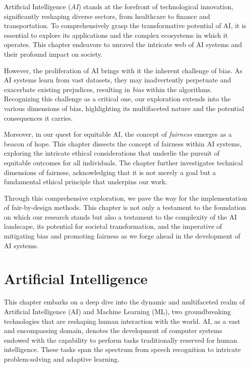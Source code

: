 \documentclass[12pt,a4paper,openright,twoside]{book}
\begin{document}
Artificial Intelligence (\emph{AI}) stands at the forefront of technological innovation, significantly reshaping diverse sectors, from healthcare to finance and transportation. To comprehensively grasp the transformative potential of AI, it is essential to explore its applications and the complex ecosystems in which it operates. This chapter endeavors to unravel the intricate web of AI systems and their profound impact on society.

However, the proliferation of AI brings with it the inherent challenge of bias. As AI systems learn from vast datasets, they may inadvertently perpetuate and exacerbate existing prejudices, resulting in \emph{bias} within the algorithms. Recognizing this challenge as a critical one, our exploration extends into the various dimensions of bias, highlighting its multifaceted nature and the potential consequences it carries. 

Moreover, in our quest for equitable AI, the concept of \emph{fairness} emerges as a beacon of hope. This chapter dissects the concept of fairness within AI systems, exploring the intricate ethical considerations that underlie the pursuit of equitable outcomes for all individuals. The chapter further investigates technical dimensions of fairness, acknowledging that it is not merely a goal but a fundamental ethical principle that underpins our work. 

Through this comprehensive exploration, we pave the way for the implementation of fair-by-design methods. This chapter is not only a testament to the foundation on which our research stands but also a testament to the complexity of the AI landscape, its potential for societal transformation, and the imperative of mitigating bias and promoting fairness as we forge ahead in the development of AI systems. 


\section{Artificial Intelligence}

This chapter embarks on a deep dive into the dynamic and multifaceted realm of Artificial Intelligence (AI) and Machine Learning (ML), two groundbreaking technologies that are reshaping human interaction with the world. AI, as a vast and encompassing domain, denotes the development of computer systems endowed with the capability to perform tasks traditionally reserved for human intelligence. These tasks span the spectrum from speech recognition to intricate problem-solving and adaptive learning. 
\end{document}

